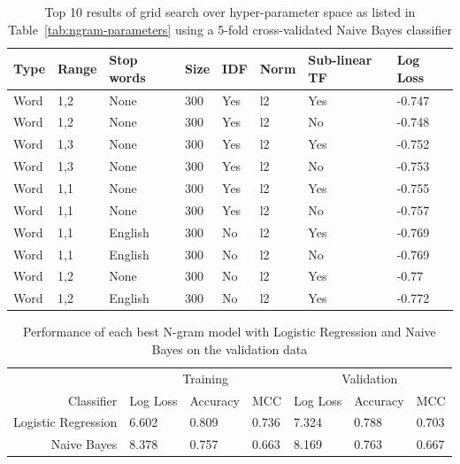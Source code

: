 \begin{center}
  \begin{table}[h]
  \begin{tabular}{ l l l l l l l l }
    \toprule
    Type & Range & Stop words & Size & IDF & Norm & Sub-linear TF & Log Loss \\
    \midrule
    Word & 1,2 & None & 300 & Yes & l2 & Yes & -0.747 \\
    Word & 1,2 & None & 300 & Yes & l2 & No & -0.748 \\
    Word & 1,3 & None & 300 & Yes & l2 & Yes & -0.752 \\
    Word & 1,3 & None & 300 & Yes & l2 & No & -0.753 \\
    Word & 1,1 & None & 300 & Yes & l2 & Yes & -0.755 \\
    Word & 1,1 & None & 300 & Yes & l2 & No & -0.757 \\
    Word & 1,1 & English & 300 & No & l2 & Yes & -0.769 \\
    Word & 1,1 & English & 300 & No & l2 & No & -0.769 \\
    Word & 1,2 & None    & 300 & No & l2 & Yes & -0.77 \\
    Word & 1,2 & English & 300 & No & l2 & Yes & -0.772 \\
    \bottomrule
  \end{tabular}
  \caption{Top 10 results of grid search over hyper-parameter space as listed in Table~\ref{tab:ngram-parameters} using a 5-fold cross-validated Naive Bayes classifier}
\label{tab:ngram-grid-results-nb}
  \end{table}
\end{center}


\begin{center}
  \begin{table}[h]
  \begin{tabular}{ r | *3l | *3l }
    \toprule
     & \multicolumn{3}{c|}{Training} & \multicolumn{3}{|c}{Validation}\\
    Classifier & Log Loss & Accuracy & MCC & Log Loss & Accuracy & MCC \\
    \midrule
    Logistic Regression & 6.602 & 0.809 & 0.736 & 7.324 & 0.788 & 0.703 \\
    Naive Bayes         & 8.378 & 0.757 & 0.663 & 8.169 & 0.763 & 0.667 \\
    \bottomrule
  \end{tabular}
  \caption{Performance of each best N-gram model with Logistic Regression and Naive Bayes on the validation data}
\label{tab:ngram-grid-results-nb}
  \end{table}
\end{center}


